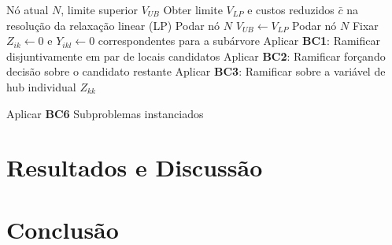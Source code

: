 \begin{algorithm}[H]
\caption{Avaliação do Nó no \textit{Branch-and-Bound}}
\label{alg:bb}
\begin{algorithmic}[1]
\Require Nó atual $N$, limite superior $V_{UB}$
\State Obter limite $V_{LP}$ e custos reduzidos $\bar{c}$ na resolução da relaxação linear (LP)
    \State \Return Podar nó $N$
\EndIf
{}
    \State $V_{UB} \gets V_{LP}$
    \State \Return Podar nó $N$
\EndIf
\State {}
        \State Fixar $Z_{ik} \gets 0$ e $Y_{ikl} \gets 0$ correspondentes para a subárvore
    \EndIf
\EndFor
\State {}
        \State Aplicar \textbf{BC1}: Ramificar disjuntivamente em par de locais candidatos
        \State Aplicar \textbf{BC2}: Ramificar forçando decisão sobre o candidato restante
    \Else
        \State Aplicar \textbf{BC3}: Ramificar sobre a variável de hub individual $Z_{kk}$
    \EndIf
\Else
    \State {}

    \State Aplicar \textbf{BC6}
\EndIf
\State \Return Subproblemas instanciados
\end{algorithmic}
\end{algorithm}


\section{Resultados e Discussão}

\section{Conclusão}

\printbibliography
